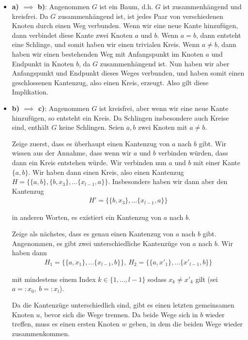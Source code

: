 \documentclass[12pt]{article}
\begin{document}
\begin{itemize}
    \item \textbf{a) $\implies$ b)}: Angenommen $G$ ist ein Baum, d.h. $G$ ist zusammenhängend und kreisfrei. Da $G$ zusammenhängend ist, ist jedes Paar von verschiedenen Knoten durch einen Weg verbunden. Wenn wir eine neue Kante hinzufügen, dann verbindet diese Kante zwei Knoten $a$ und $b$. Wenn $a = b$, dann entsteht eine Schlinge, und somit haben wir einen trivialen Kreis. Wenn $a \neq b$, dann haben wir einen bestehenden Weg mit Anfangspunkt im Knoten $a$ und Endpunkt in Knoten $b$, da $G$ zusammenhängend ist. Nun haben wir aber Anfangspunkt und Endpunkt dieses Weges verbunden, und haben somit einen geschlossenen Kantenzug, also einen Kreis, erzeugt. Also gilt diese Implikation.
    \item \textbf{b) $\implies$ c)}: Angenommen $G$ ist kreisfrei, aber wenn wir eine neue Kante hinzufügen, so entsteht ein Kreis. Da Schlingen insbesondere auch Kreise sind, enthält $G$ keine Schlingen. Seien $a, b$ zwei Knoten mit $a \neq b$.
    
    Zeige zuerst, dass es überhaupt einen Kantenzug von $a$ nach $b$ gibt. Wir wissen aus der Annahme, dass wenn wir $a$ und $b$ verbinden würden, dass dann ein Kreis entstehen würde. Wir verbinden nun $a$ und $b$ mit einer Kante $\{a, b\}$. Wir haben dann einen Kreis, also einen Kantenzug $H = \{\{a, b\}, \{b, x_3\}, \dots \{x_{l-1}, a\}\}$. Insbesondere haben wir dann aber den Kantenzug
    \begin{align*}
        H' = \{\{b, x_3\}, \dots \{x_{l-1}, a\}\}
    \end{align*}

    in anderen Worten, es existiert ein Kantenzug von $a$ nach $b$.

    Zeige als nächstes, dass es genau einen Kantenzug von $a$ nach $b$ gibt. Angenommen, es gibt zwei unterschiedliche Kantenzüge von $a$ nach $b$. Wir haben dann
    \begin{align*}
        H_1 = \{\{a, x_1\}, \dots \{x_{l-1}, b\}\},\ H_2 = \{\{a, x'_1\}, \dots \{x'_{l-1}, b\}\}
    \end{align*}

    mit mindestens einem Index $k \in \{1,\dots,l-1\}$ sodass $x_k \neq x'_k$ gilt (sei $a =: x_0,\ b =: x_l$). 

    Da die Kantenzüge unterschiedlich sind, gibt es einen letzten gemeinsamen Knoten $u$, bevor sich die Wege trennen. Da beide Wege sich in $b$ wieder treffen, muss es einen ersten Knoten $w$ geben, in dem die beiden Wege wieder zusammenkommen.


\end{itemize}
\end{document}
